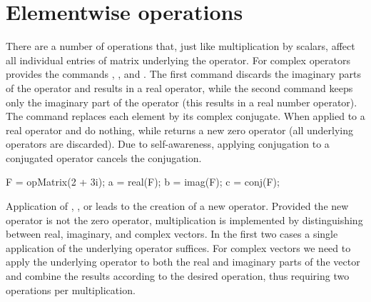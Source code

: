 


\vspace*{1em}


\section{Elementwise operations} \label{Sec:SparcoConj}
                                      \label{Sec:SparcoDouble}

There are a number of operations that, just like multiplication by
scalars, affect all individual entries of matrix underlying the
operator. For complex operators \spot{} provides the commands
, , and . The first command
discards the imaginary parts of the operator and results in a real
operator, while the second command keeps only the imaginary part of
the operator (this results in a real number operator). The
 command replaces each element by its complex
conjugate. When applied to a real operator  and
 do nothing, while  returns a new zero
operator (all underlying operators are discarded). Due to 
self-awareness, applying conjugation to a conjugated operator cancels
the conjugation.

\begin{codeblock}
F = opMatrix(2 + 3i);
a = real(F);          %
b = imag(F);          %
c = conj(F);          %
\end{codeblock}

Application of , , or  leads to
the creation of a new operator. Provided the new operator is not the
zero operator, multiplication is implemented by distinguishing between
real, imaginary, and complex vectors. In the first two cases a single
application of the underlying operator suffices. For complex vectors
we need to apply the underlying operator to both the real and
imaginary parts of the vector and combine the results according to the
desired operation, thus requiring two operations per multiplication.

